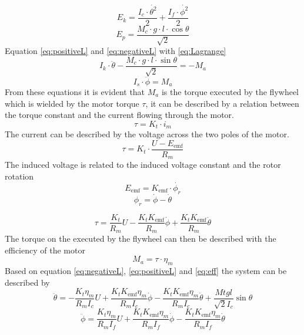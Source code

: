 \documentclass[a4paper,11pt]{kth-mag}
\begin{document}
\begin{equation}
E_k = \frac{I_c \cdot \dot{\theta^2}}{2} + \frac{I_f \cdot \dot{\phi^2} }{2}
\end{equation}
\begin{equation}
E_p = \frac{M_c \cdot g \cdot l \cdot \cos \theta}{\sqrt{2}}
\end{equation}
Equation \eqref{eq:positiveL} and \eqref{eq:negativeL} with \eqref{eq:Lagrange}
\begin{equation} \label{eq:negativeL2}
I_k \cdot \ddot{\theta} - \frac{M_c \cdot g \cdot l \cdot \sin \theta }{\sqrt{2}}  = -M_a
\end{equation}
\begin{equation} \label{eq:postiveL2}
I_s \cdot \ddot{\phi} = M_a
\end{equation}
From these equations it is evident that $M_a$ is the torque executed by the flywheel which is wielded by the motor torque $\tau$, it can be described by a relation between the torque constant and the current flowing through the motor.
\begin{equation}
\tau = K_t \cdot i_m
\end{equation}
The current can be described by the voltage across the two poles of the motor. 
\begin{equation}
\tau = K_t \cdot \frac{U-E_{\text{emf}} }{R_m}
\end{equation}
The induced voltage is related to the induced voltage constant and the rotor rotation
\begin{equation}
E_{\text{emf}} = K_{\text{emf}} \cdot \dot{\phi_r}
\end{equation}
\begin{equation}
\phi_r = \dot{\phi} - \dot{\theta}
\end{equation}
 
\begin{equation} \label{eq:tau}
\tau = \frac{K_t}{R_m} U - \frac{K_t K_{\text{emf}} }{R_m} \dot{\phi} + \frac{K_t K_{\text{emf}} }{R_m} \dot{\theta}
\end{equation}
The torque on the executed by the flywheel can then be described with the efficiency of the motor
\begin{equation} \label{eq:eff}
M_a = \tau \cdot \eta_m
\end{equation}
Based on equation \eqref{eq:negativeL}, \eqref{eq:positiveL} and \eqref{eq:eff} the system can be described by
\begin{equation}
\ddot{\theta} = -\frac{K_t \eta_m}{R_m I_c} U + \frac{K_t K_{\text{emf}} \eta_m}{R_m I_c} \dot{\phi} - \frac{K_t K_{\text{emf}} \eta_m}{R_m I_c} \dot{\theta} + \frac{Mt g l }{\sqrt{2} I_c} \sin \theta \label{thetadotdot}
\end{equation}
\begin{equation}
\ddot{\phi} = \frac{K_t \eta_m}{R_m I_f} U + \frac{K_t K_{\text{emf}} \eta_m}{R_m I_f} \dot{\phi} - \frac{K_t K_{\text{emf}} \eta_m}{R_m I_f} \dot{\theta} 
\label{phidotdot}
\end{equation} 
\end{document}
